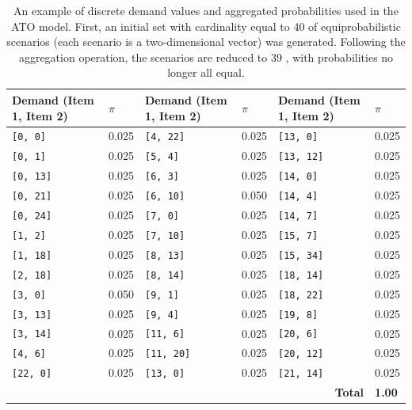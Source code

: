 \documentclass[a4paper,12pt]{article}
\begin{document}
	
	\begin{table}[H]
		\centering
		\footnotesize
		\label{tab:ato-general-results}
		\renewcommand{\arraystretch}{1.1}
		\begin{tabular}{|@{\hskip 2pt}p{3.2cm}@{\hskip 2pt}|@{\hskip 2pt}p{1cm}@{\hskip 2pt}||@{\hskip 2pt}p{3.2cm}@{\hskip 2pt}|@{\hskip 2pt}p{1cm}@{\hskip 2pt}||@{\hskip 2pt}p{3.2cm}@{\hskip 2pt}|@{\hskip 2pt}p{1cm}@{\hskip 2pt}|}
			\hline
			\textbf{Demand (Item 1, Item 2)} & \textbf{$\pi$} &
			\textbf{Demand (Item 1, Item 2)} & \textbf{$\pi$} &
			\textbf{Demand (Item 1, Item 2)} & \textbf{$\pi$} \\
			\hline
			\texttt{[0, 0]}    & 0.025 & \texttt{[4, 22]}   & 0.025 & \texttt{[13, 0]}   & 0.025 \\
			\texttt{[0, 1]}    & 0.025 & \texttt{[5, 4]}    & 0.025 & \texttt{[13, 12]}  & 0.025 \\
			\texttt{[0, 13]}   & 0.025 & \texttt{[6, 3]}    & 0.025 & \texttt{[14, 0]}   & 0.025 \\
			\texttt{[0, 21]}   & 0.025 & \texttt{[6, 10]}   & 0.050 & \texttt{[14, 4]}   & 0.025 \\
			\texttt{[0, 24]}   & 0.025 & \texttt{[7, 0]}    & 0.025 & \texttt{[14, 7]}   & 0.025 \\
			\texttt{[1, 2]}    & 0.025 & \texttt{[7, 10]}   & 0.025 & \texttt{[15, 7]}   & 0.025 \\
			\texttt{[1, 18]}   & 0.025 & \texttt{[8, 13]}   & 0.025 & \texttt{[15, 34]}  & 0.025 \\
			\texttt{[2, 18]}   & 0.025 & \texttt{[8, 14]}   & 0.025 & \texttt{[18, 14]}  & 0.025 \\
			\texttt{[3, 0]}    & 0.050 & \texttt{[9, 1]}    & 0.025 & \texttt{[18, 22]}  & 0.025 \\
			\texttt{[3, 13]}   & 0.025 & \texttt{[9, 4]}    & 0.025 & \texttt{[19, 8]}   & 0.025 \\
			\texttt{[3, 14]}   & 0.025 & \texttt{[11, 6]}   & 0.025 & \texttt{[20, 6]}   & 0.025 \\
			\texttt{[4, 6]}    & 0.025 & \texttt{[11, 20]}  & 0.025 & \texttt{[20, 12]}  & 0.025 \\
			\texttt{[22, 0]}   & 0.025 & \texttt{[13, 0]}   & 0.025 & \texttt{[21, 14]}  & 0.025 \\
			\hline
			\multicolumn{5}{|r|}{\textbf{Total}} & \textbf{1.00} \\
			\hline
		\end{tabular}
		\caption{An example of discrete demand values and aggregated probabilities used in the ATO model. First, an initial set with cardinality equal to 40 of equiprobabilistic scenarios (each scenario is a two-dimensional vector) was generated. Following the aggregation operation, the scenarios are reduced to 39 , with probabilities no longer all equal.}
	\end{table}
	
\end{document}
